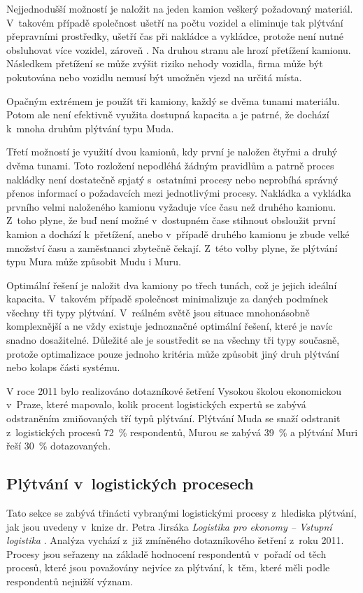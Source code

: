 Nejjednodušší možností je naložit na jeden kamion veškerý požadovaný materiál. V~takovém případě společnost ušetří na počtu vozidel a eliminuje tak plýtvání přepravními prostředky, ušetří čas při nakládce a vykládce, protože není nutné obsluhovat více vozidel, zároveň . Na druhou stranu ale hrozí přetížení kamionu. Následkem přetížení se může zvýšit riziko nehody vozidla, firma může být pokutována nebo vozidlu nemusí být umožněn vjezd na určitá místa.

Opačným extrémem je použít tři kamiony, každý se dvěma tunami materiálu. Potom ale není efektivně využita dostupná kapacita a je patrné, že dochází k~mnoha druhům plýtvání typu Muda.

Třetí možností je využití dvou kamionů, kdy první je naložen čtyřmi a druhý dvěma tunami. Toto rozložení nepodléhá žádným pravidlům a patrně proces nakládky není dostatečně spjatý s~ostatními procesy nebo neprobíhá správný přenos informací o požadavcích mezi jednotlivými procesy. Nakládka a vykládka prvního velmi naloženého kamionu vyžaduje více času než druhého kamionu. Z~toho plyne, že buď není možné v~dostupném čase stihnout obsloužit první kamion a dochází k~přetížení, anebo v~případě druhého kamionu je zbude velké množství času a zaměstnanci zbytečně čekají. Z~této volby plyne, že plýtvání typu Mura může způsobit Mudu i Muru.\cite{bib:LW3}

Optimální řešení je naložit dva kamiony po třech tunách, což je jejich ideální kapacita. V~takovém případě společnost minimalizuje za daných podmínek všechny tři typy plýtvání. V~reálném světě jsou situace mnohonásobně komplexnější a ne vždy existuje jednoznačné optimální řešení, které je navíc snadno dosažitelné. Důležité ale je soustředit se na všechny tři typy současně, protože optimalizace pouze jednoho kritéria může způsobit jiný druh plýtvání nebo kolaps části systému. 

V roce 2011 bylo realizováno dotazníkové šetření Vysokou školou ekonomickou v~Praze, které mapovalo, kolik procent logistických expertů se zabývá odstraněním zmiňovaných tří typů plýtvání. Plýtvání Muda se snaží odstranit z~logistických procesů 72~\% respondentů, Murou se zabývá 39~\% a plýtvání Muri řeší 30~\% dotazovaných.\cite{bib:Jirsak}

\subsection{Plýtvání v~logistických procesech}

Tato sekce se zabývá třinácti vybranými logistickými procesy z~hlediska plýtvání, jak jsou uvedeny v~knize dr. Petra Jirsáka \emph{Logistika pro ekonomy -- Vstupní logistika} \cite{bib:Jirsak}. Analýza vychází z~již zmíněného dotazníkového šetření z~roku 2011. Procesy jsou seřazeny na základě hodnocení respondentů v~pořadí od těch procesů, které jsou považovány nejvíce za plýtvání, k~těm, které měli podle respondentů nejnižší význam.

